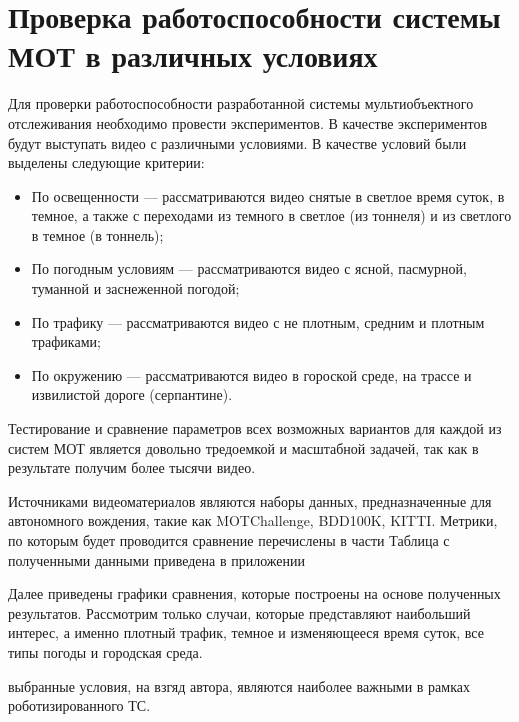 \section{Проверка работоспособности системы МОТ в различных условиях}

Для проверки работоспособности разработанной системы мультиобъектного отслеживания необходимо провести экспериментов. В качестве экспериментов будут выступать видео с различными условиями. В качестве условий были выделены следующие критерии:

\begin{itemize}
    \item По освещенности --- рассматриваются видео снятые в светлое время суток, в темное, а также с переходами из темного в светлое (из тоннеля) и из светлого в темное (в тоннель);
    \item По погодным условиям --- рассматриваются видео с ясной, пасмурной, туманной и заснеженной погодой;
    \item По трафику --- рассматриваются видео с не плотным, средним и плотным трафиками;
    \item По окружению --- рассматриваются видео в гороской среде, на трассе и извилистой дороге (серпантине).
\end{itemize}

Тестирование и сравнение параметров всех возможных вариантов для каждой из систем МОТ является довольно тредоемкой и масштабной задачей, так как в результате получим более тысячи видео.

Источниками видеоматериалов являются наборы данных, предназначенные для автономного вождения, такие как MOTChallenge, BDD100K, KITTI. Метрики, по которым будет проводится сравнение перечислены в части%
Таблица с полученными данными приведена в приложении%

Далее приведены графики сравнения, которые построены на основе полученных результатов. Рассмотрим только случаи, которые представляют наибольший интерес, а именно плотный трафик, темное и изменяющееся время суток, все типы погоды и городская среда.

выбранные условия, на взгяд автора, являются наиболее важными в рамках роботизированного ТС. 
